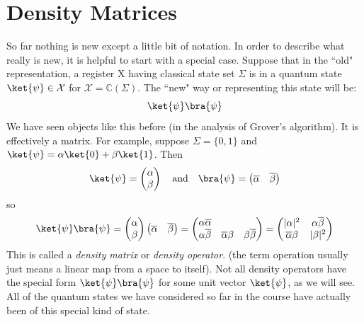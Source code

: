 \documentclass[12pt, oneside]{book}
\theoremstyle{definition}
\theoremstyle{definition}
\theoremstyle{remark}
\begin{document}
\section{Density Matrices}
 So far nothing is new except a little bit of notation. In order to describe what really is new, it is helpful to start with a special case. Suppose that in the ``old" representation, a register X having classical state set $\Sigma$ is in a quantum state $\ket{\psi} \in \mathcal{X}$ for $\mathcal{X} = \mathbb{C}(\Sigma)$. The ``new" way or representing this state will be:
\[
\ket{\psi}\bra{\psi}
\]
We have seen objects like this before (in the analysis of Grover's algorithm). It is effectively a matrix. For example, suppose $\Sigma = \{0,1\}$ and $\ket{\psi}=\alpha\ket{0}+\beta\ket{1}$. Then
\[
\ket{\psi}=\begin{pmatrix} \alpha \\ \beta \end{pmatrix} \quad \text{and} \quad \bra{\psi} = \begin{pmatrix} \overline{\alpha} & \overline{\beta} \end{pmatrix}
\]
so
\[
\ket{\psi}\bra{\psi} =\begin{pmatrix} \alpha \\ \beta \end{pmatrix} \begin{pmatrix} \overline{\alpha} & \overline{\beta} \end{pmatrix} = \begin{pmatrix} \alpha\overline{\alpha}  \\ \alpha\overline{\beta} & \overline{\alpha} \beta & \beta\overline{\beta} \end{pmatrix} = \begin{pmatrix} |\alpha|^2 & \alpha \overline{\beta} \\ \overline{\alpha}\beta & |\beta|^2 \end{pmatrix}
\]
This is called a \textit{density matrix} or \textit{density operator}. (the term operation usually just means a linear map from a space to itself). Not all density operators have the special form $\ket{\psi}\bra{\psi}$ for some unit vector $\ket{\psi}$, as we will see. All of the quantum states we have considered so far in the course have actually been of this special kind of state.
\end{document}
